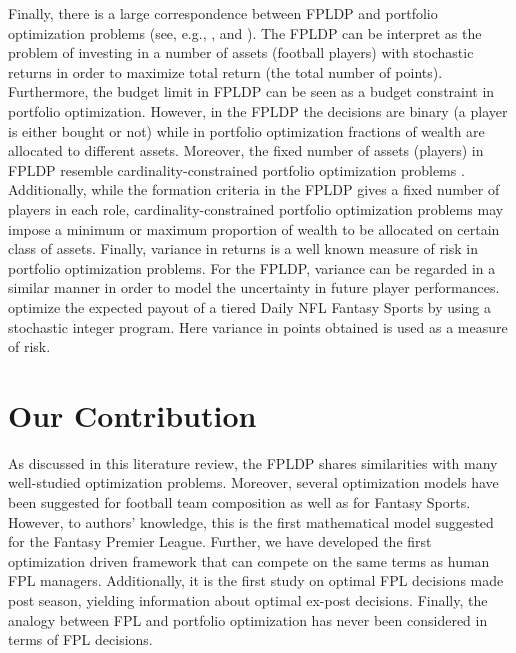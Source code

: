\newpar

Finally, there is a large correspondence between FPLDP and portfolio optimization problems (see, e.g., \cite{Markowitz}, \cite{Zenios} and \cite{Speranza}). The FPLDP can be interpret as the problem of investing in a number of assets (football players) with stochastic returns in order to maximize total return (the total number of points). Furthermore, the budget limit in FPLDP can be seen as a budget constraint in portfolio optimization. However, in the FPLDP the decisions are binary (a player is either bought or not) while in portfolio optimization fractions of wealth are allocated to different assets. Moreover, the fixed number of assets (players) in FPLDP resemble cardinality-constrained portfolio optimization problems \citep{Chang}. Additionally, while the formation criteria in the FPLDP gives a fixed number of players in each role, cardinality-constrained portfolio optimization problems may impose a minimum or maximum proportion of wealth to be allocated on certain class of assets. Finally, variance in returns is a well known measure of risk in portfolio optimization problems. For the FPLDP, variance can be regarded in a similar manner in order to model the uncertainty in future player performances. \cite{Dailyfantasysports} optimize the expected payout of a tiered Daily NFL Fantasy Sports by using a stochastic integer program. Here variance in points obtained is used as a measure of risk.



\section{Our Contribution}
As discussed in this literature review, the FPLDP shares similarities with many well-studied optimization problems. Moreover, several optimization models have been suggested for football team composition as well as for Fantasy Sports. However, to authors' knowledge, this is the first mathematical model suggested for the Fantasy Premier League. Further, we have developed the first optimization driven framework that can compete on the same terms as human FPL managers. Additionally, it is the first study on optimal FPL decisions made post season, yielding information about optimal ex-post decisions. Finally, the analogy between FPL and portfolio optimization has never been considered in terms of FPL decisions. 





